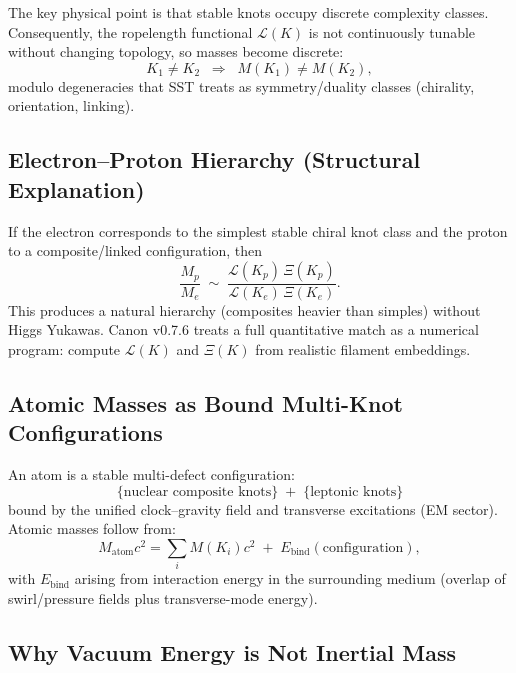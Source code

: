 \documentclass[10pt]{article}
\begin{document}
        The key physical point is that stable knots occupy discrete complexity classes.
        Consequently, the ropelength functional $\mathcal{L}(K)$ is not continuously tunable
        without changing topology, so masses become discrete:
        \begin{equation}
            K_1\neq K_2 \;\;\Rightarrow\;\; M(K_1)\neq M(K_2),
        \end{equation}
        modulo degeneracies that SST treats as symmetry/duality classes (chirality,
        orientation, linking).

    \subsection{Electron--Proton Hierarchy (Structural Explanation)}

        If the electron corresponds to the simplest stable chiral knot class and the proton
        to a composite/linked configuration, then
        \begin{equation}
            \frac{M_p}{M_e}\;\sim\;\frac{\mathcal{L}(K_p)\,\Xi(K_p)}{\mathcal{L}(K_e)\,\Xi(K_e)}.
        \end{equation}
        This produces a natural hierarchy (composites heavier than simples) without Higgs
        Yukawas. Canon v0.7.6 treats a full quantitative match as a numerical program:
        compute $\mathcal{L}(K)$ and $\Xi(K)$ from realistic filament embeddings.

    \subsection{Atomic Masses as Bound Multi-Knot Configurations}

        An atom is a stable multi-defect configuration:
        \[
            \{\text{nuclear composite knots}\} \;+\; \{\text{leptonic knots}\}
        \]
        bound by the unified clock--gravity field and transverse excitations (EM sector).
        Atomic masses follow from:
        \begin{equation}
            M_{\text{atom}}c^2
            =
            \sum_i M(K_i)c^2
            \;+\;E_{\text{bind}}(\text{configuration}),
        \end{equation}
        with $E_{\text{bind}}$ arising from interaction energy in the surrounding medium
        (overlap of swirl/pressure fields plus transverse-mode energy).

    \subsection{Why Vacuum Energy is Not Inertial Mass}
\end{document}
